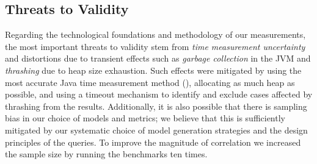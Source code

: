 
\subsection{Threats to Validity}
Regarding the technological foundations and methodology of our measurements, the
most important threats to validity stem from \emph{time measurement uncertainty}
and distortions due to transient effects such as \emph{garbage collection} in
the JVM and \emph{thrashing} due to heap size exhaustion. Such effects were
mitigated by using the most accurate Java time measurement method
(), allocating as much heap as possible, and using a
timeout mechanism to identify and exclude cases affected by thrashing from the
results.
Additionally, it is also possible that there is sampling bias in our choice of
models and metrics; we believe that this is sufficiently mitigated by our
systematic choice of model generation strategies and the design principles of
the queries. To improve the magnitude of correlation we increased the sample
size by running the benchmarks ten times.